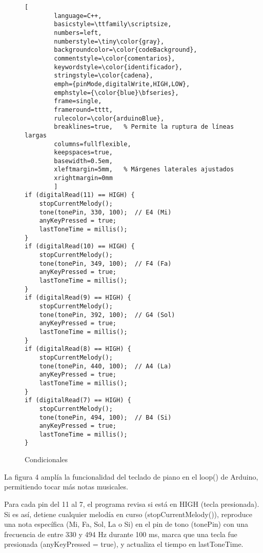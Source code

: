 
\setlength{\parindent}{0pt}
\setlength{\parskip}{6pt}
\begin{figure}[H]
	\centering
	\begin{lstlisting}[
		language=C++,
		basicstyle=\ttfamily\scriptsize,
		numbers=left,
		numberstyle=\tiny\color{gray},
		backgroundcolor=\color{codeBackground},
		commentstyle=\color{comentarios},
		keywordstyle=\color{identificador},
		stringstyle=\color{cadena},
		emph={pinMode,digitalWrite,HIGH,LOW},
		emphstyle={\color{blue}\bfseries},
		frame=single,
		frameround=tttt,
		rulecolor=\color{arduinoBlue},
		breaklines=true,   % Permite la ruptura de líneas largas
		columns=fullflexible,
		keepspaces=true,
		basewidth=0.5em,
		xleftmargin=5mm,   % Márgenes laterales ajustados
		xrightmargin=0mm
		]
if (digitalRead(11) == HIGH) {
	stopCurrentMelody();
	tone(tonePin, 330, 100);  // E4 (Mi)
	anyKeyPressed = true;
	lastToneTime = millis();
}
if (digitalRead(10) == HIGH) {
	stopCurrentMelody();
	tone(tonePin, 349, 100);  // F4 (Fa)
	anyKeyPressed = true;
	lastToneTime = millis();
}
if (digitalRead(9) == HIGH) {
	stopCurrentMelody();
	tone(tonePin, 392, 100);  // G4 (Sol)
	anyKeyPressed = true;
	lastToneTime = millis();
}
if (digitalRead(8) == HIGH) {
	stopCurrentMelody();
	tone(tonePin, 440, 100);  // A4 (La)
	anyKeyPressed = true;
	lastToneTime = millis();
}
if (digitalRead(7) == HIGH) {
	stopCurrentMelody();
	tone(tonePin, 494, 100);  // B4 (Si)
	anyKeyPressed = true;
	lastToneTime = millis();
}
	\end{lstlisting}
	\caption{Condicionales}
	\label{fig:codigo-led}
\end{figure}
La figura 4 amplía la funcionalidad del teclado de piano en el loop() de Arduino, permitiendo tocar más notas musicales.

Para cada pin del 11 al 7, el programa revisa si está en HIGH (tecla presionada). Si es así, detiene cualquier melodía en curso (stopCurrentMelody()), reproduce una nota específica (Mi, Fa, Sol, La o Si) en el pin de tono (tonePin) con una frecuencia de entre 330 y 494 Hz durante 100 ms, marca que una tecla fue presionada (anyKeyPressed = true), y actualiza el tiempo en lastToneTime.
